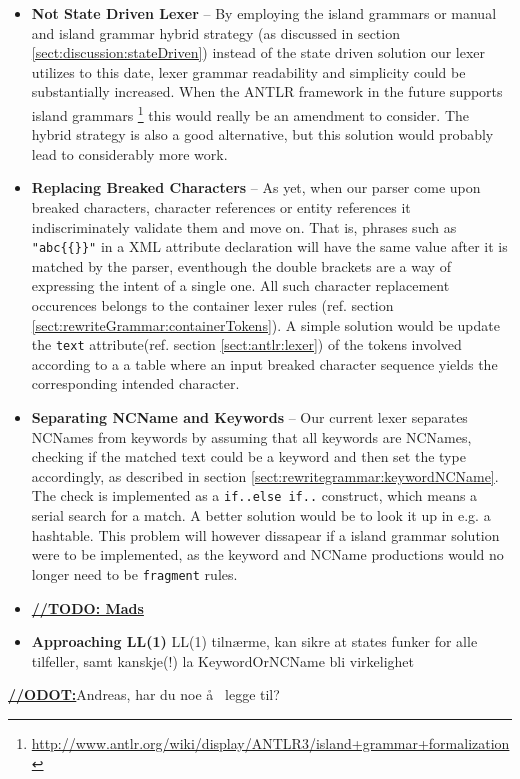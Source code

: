 \begin{itemize}

\item \textbf{Not State Driven Lexer} -- By employing the island grammars or manual and island grammar hybrid strategy (as discussed in section \ref{sect:discussion:stateDriven}) instead of the state driven solution our lexer utilizes to this date, lexer grammar readability and simplicity could be substantially increased. When the ANTLR framework in the future supports island grammars \footnote{\url{http://www.antlr.org/wiki/display/ANTLR3/island+grammar+formalization}} this would really be an amendment to consider. The hybrid strategy is also a good alternative, but this solution would probably lead to considerably more work.

\item \textbf{Replacing Breaked Characters} -- As yet, when our parser come upon breaked characters, character references or entity references it indiscriminately validate them and move on. That is, phrases such as \verb!"abc{{}}"! in a XML attribute declaration will have the same value after it is matched by the parser, eventhough the double brackets are a way of expressing the intent of a single one. All such character replacement occurences belongs to the container lexer rules (ref. section \ref{sect:rewriteGrammar:containerTokens}). A simple solution would be update the \verb!text! attribute(ref. section \ref{sect:antlr:lexer}) of the tokens involved according to a a table where an input breaked character sequence yields the corresponding intended character.

\item \textbf{Separating NCName and Keywords} -- Our current lexer separates NCNames from keywords by assuming that all keywords are NCNames, checking if the matched text could be a keyword and then set the type accordingly, as described in section \ref{sect:rewritegrammar:keywordNCName}. The check is implemented as a \verb!if..else if..! construct, which means a serial search for a match. A better solution would be to look it up in e.g. a hashtable. This problem will however dissapear if a island grammar solution were to be implemented, as the keyword and NCName productions would no longer need to be \verb!fragment! rules.

\item \underline{\textbf{\LARGE //TODO: Mads}} 

\item \textbf{Approaching LL(1)} LL(1) tiln\ae rme, kan sikre at states funker for alle tilfeller, samt kanskje(!) la KeywordOrNCName bli virkelighet

\end{itemize}

\underline{\textbf{\LARGE //ODOT:}}Andreas, har du noe \aa~ legge til?




